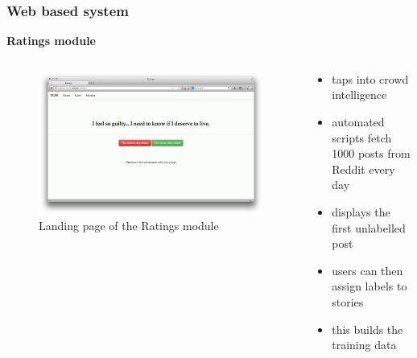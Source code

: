 \documentclass[9pt]{beamer}
\begin{document}
    \begin{frame}
        \frametitle{Web based system}
        \begin{center}
            \textbf{Ratings module}
        \end{center}
        \begin{columns}
            \begin{column}{0.5\textwidth}
                \begin{figure}
                    \centering
                    \includegraphics[width=\textwidth]{figures/ratings.png}
                    \caption{Landing page of the Ratings module}
                \end{figure}
            \end{column}
            \begin{column}{0.5\textwidth}
                \begin{itemize}
                    \item{taps into crowd intelligence}
                    \item{automated scripts fetch 1000 posts from Reddit every day}
                    \item{displays the first unlabelled post}
                    \item{users can then assign labels to stories}
                    \item{this builds the training data}
                \end{itemize}
            \end{column}
        \end{columns}
    \end{frame}
    
\end{document}

